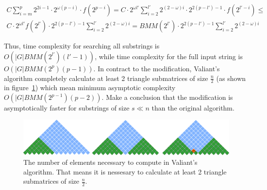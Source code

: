 \begin{equation}
\begin{array}{c}
C \sum\limits_{i=m}^p 2^{2i - 1} \cdot 2^{\omega(p - i)} \cdot f(2^{p - i}) =
C \cdot 2^{\omega l'}\sum\limits_{i=2}^{l'} 2^{(2 - \omega)i} \cdot 2^{2(p - l') - 1} \cdot f(2^{l' - i}) \le \\
C \cdot 2^{\omega l'} f(2^{l'}) \cdot 2^{2(p - l') - 1} \sum\limits_{i=2}^{l'} 2^{(2 - \omega)i} =
BMM(2^{l'}) \cdot 2^{2(p - l') - 1} \sum\limits_{i=2}^{l'} 2^{(2 - \omega)i}
\end{array}
\end{equation}

Thus, time complexity for searching all substrings is  $O(|G|BMM(2^{l'})(l' - 1))$, while time complexity for the full input string is $O(|G|BMM(2^p)(p - 1))$. In contract to the modification, Valiant's algorithm completely calculate at least 2 triangle submatrices of size $\frac{n}{2}$ (as shown in figure~\ref{fig5}) which mean minimum asymptotic complexity  $O(|G|BMM(2^{p - 1})(p - 2))$. Make a conclusion that the modification is asymptotically faster for substrings of size $s \ll n$  than the original algorithm.

\begin{figure}[h]
\vspace{3mm}
 \begin{center}
 \includegraphics[width=12cm]{pictures/valsubstring.pdf}
    \caption{The number of elements necessary to compute in Valiant's algorithm. That means it is nessesary to calculate at least 2 triangle submatrices of size $\frac{n}{2}$.}
    \label{fig5}
 \end{center}
\vspace{-8mm}
\end{figure}